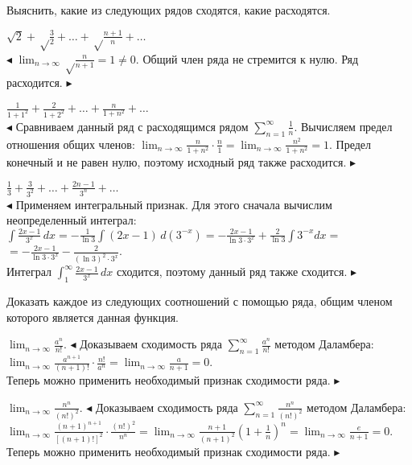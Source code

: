 \documentclass[a5paper,10pt]{article}
\begin{document}
\medskip
\noindent Выяснить, какие из следующих рядов сходятся, какие расходятся.

\medskip
{} $\displaystyle\sqrt2+\sqrt\frac32+\ldots+\sqrt\frac{n+1}{n}+\ldots$\\
$\blacktriangleleft$ $\displaystyle\lim_{n\to\infty}\sqrt\frac{n}{n+1}=1\ne0$.
Общий член ряда не стремится к нулю. Ряд расходится. $\blacktriangleright$

\medskip
{} $\displaystyle\frac{1}{1+1^2}+\frac{2}{1+2^2}+\ldots+
\frac{n}{1+n^2}+\ldots$\\
$\blacktriangleleft$ Сравниваем данный ряд с расходящимся рядом
$\displaystyle\sum_{n=1}^\infty\frac1n$. Вычисляем предел отношения общих членов:
$\displaystyle\lim_{n\to\infty}\frac{n}{1+n^2}\cdot\frac{n}{1}=
\lim_{n\to\infty}\frac{n^2}{1+n^2}=1$. Предел конечный и не равен нулю, поэтому
исходный ряд также расходится. $\blacktriangleright$

\medskip
{} $\displaystyle\frac13+\frac{3}{3^2}+\ldots+\frac{2n-1}{3^n}+\ldots$\\
$\blacktriangleleft$ Применяем интегральный признак. Для этого сначала вычислим
неопределенный интеграл:\\
$\displaystyle\int\frac{2x-1}{3^x}\,dx=-\frac{1}{\ln3}\int(2x-1)\,d(3^{-x})=
-\frac{2x-1}{\ln3\cdot3^x}+\frac{2}{\ln3}\int 3^{-x}dx=$\\
$\displaystyle =
-\frac{2x-1}{\ln3\cdot3^x}-\frac{2}{(\ln3)^2\cdot 3^x}$.\\
Интеграл $\displaystyle\int_1^\infty\frac{2x-1}{3^x}\,dx$ сходится, поэтому
данный ряд также сходится. $\blacktriangleright$

\medskip
\noindent Доказать каждое из следующих соотношений с помощью ряда, общим
членом которого является данная функция.

\medskip
{} $\displaystyle\lim_{n\to\infty}\frac{a^n}{n!}$.
$\blacktriangleleft$ Доказываем сходимость ряда
$\displaystyle\sum_{n=1}^{\infty}\frac{a^n}{n!}$ методом Даламбера:\\
$\displaystyle\lim_{n\to\infty}\frac{a^{n+1}}{(n+1)!}\cdot\frac{n!}{a^n}=
\lim_{n\to\infty}\frac{a}{n+1}=0$.\\
Теперь можно применить необходимый признак сходимости ряда.
$\blacktriangleright$

\medskip
{} $\displaystyle\lim_{n\to\infty}\frac{n^n}{(n!)^2}$.
$\blacktriangleleft$ Доказываем сходимость ряда
$\displaystyle\sum_{n=1}^{\infty}\frac{n^n}{(n!)^2}$ методом Даламбера:\\
$\displaystyle\lim_{n\to\infty}\frac{(n+1)^{n+1}}{[(n+1)!]^2}\cdot\frac{(n!)^2}{n^n}=
\lim_{n\to\infty}\frac{n+1}{(n+1)^2}\left(1+\frac1n\right)^n=
\lim_{n\to\infty}\frac{e}{n+1}=0$.\\
Теперь можно применить необходимый признак сходимости ряда.
$\blacktriangleright$
\end{document}
